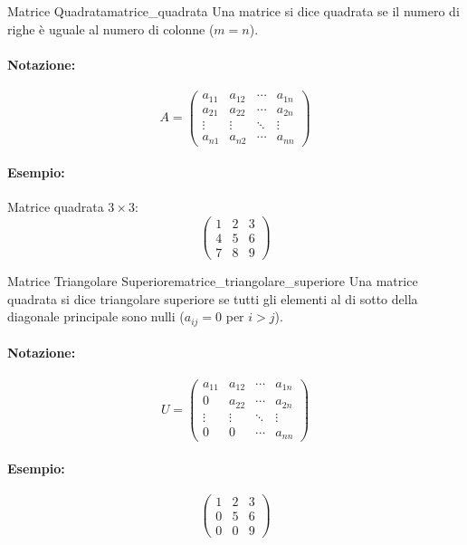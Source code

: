 \documentclass{article}
\begin{document}
\begin{definition}{Matrice Quadrata}{matrice_quadrata}
Una matrice si dice quadrata se il numero di righe è uguale al numero di colonne ($m=n$).
\paragraph{Notazione:}
\[ A = \begin{pmatrix}
a_{11} & a_{12} & \cdots & a_{1n} \\
a_{21} & a_{22} & \cdots & a_{2n} \\
\vdots & \vdots & \ddots & \vdots \\
a_{n1} & a_{n2} & \cdots & a_{nn}
\end{pmatrix} \]
\paragraph{Esempio:} Matrice quadrata $3 \times 3$:
\[ \begin{pmatrix}
1 & 2 & 3 \\
4 & 5 & 6 \\
7 & 8 & 9
\end{pmatrix} \]
\end{definition}

\begin{definition}{Matrice Triangolare Superiore}{matrice_triangolare_superiore}
Una matrice quadrata si dice triangolare superiore se tutti gli elementi al di sotto della diagonale principale sono nulli ($a_{ij} = 0$ per $i>j$).
\paragraph{Notazione:}
\[ U = \begin{pmatrix}
a_{11} & a_{12} & \cdots & a_{1n} \\
0 & a_{22} & \cdots & a_{2n} \\
\vdots & \vdots & \ddots & \vdots \\
0 & 0 & \cdots & a_{nn}
\end{pmatrix} \]
\paragraph{Esempio:}
\[ \begin{pmatrix}
1 & 2 & 3 \\
0 & 5 & 6 \\
0 & 0 & 9
\end{pmatrix} \]
\end{definition}
\end{document}
